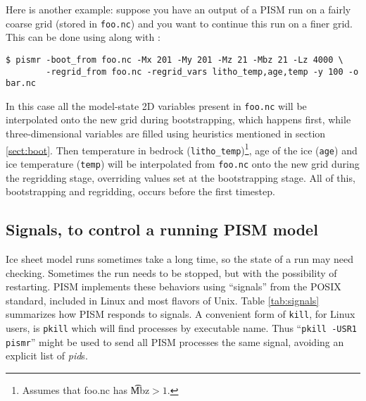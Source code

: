 Here is another example: suppose you have an output of a PISM run on a fairly coarse grid (stored in \verb|foo.nc|) and you want to continue this run on a finer grid. This can be done using  along with :
\begin{verbatim}
$ pismr -boot_from foo.nc -Mx 201 -My 201 -Mz 21 -Mbz 21 -Lz 4000 \
        -regrid_from foo.nc -regrid_vars litho_temp,age,temp -y 100 -o bar.nc
\end{verbatim}
In this case all the model-state 2D variables present in \verb|foo.nc| will be interpolated onto the new grid during bootstrapping, which happens first, while three-dimensional variables are filled using heuristics mentioned in section \ref{sect:boot}.  Then temperature in bedrock (\verb|litho_temp|)\footnote{Assumes that foo.nc has \t{Mbz}$>1$.}, age of the ice (\verb|age|) and ice temperature (\verb|temp|) will be interpolated from \verb|foo.nc| onto the new grid during the regridding stage, overriding values set at the bootstrapping stage.  All of this, bootstrapping and regridding, occurs before the first timestep.


\newcommand\pid{\textsl{pid}s}

\subsection{Signals, to control a running PISM model} \label{subsect:signal}    Ice sheet model runs sometimes take a long time, so the state of a run may need checking.  Sometimes the run needs to be stopped, but with the possibility of restarting.  PISM implements these behaviors using ``signals'' from the POSIX standard, included in Linux and most flavors of Unix.  Table \ref{tab:signals} summarizes how PISM responds to signals.  A convenient form of \verb|kill|, for Linux users, is \verb|pkill| which will find processes by executable name.  Thus ``\verb|pkill -USR1 pismr|'' might be used to send all PISM processes the same signal, avoiding an explicit list of \pid.

